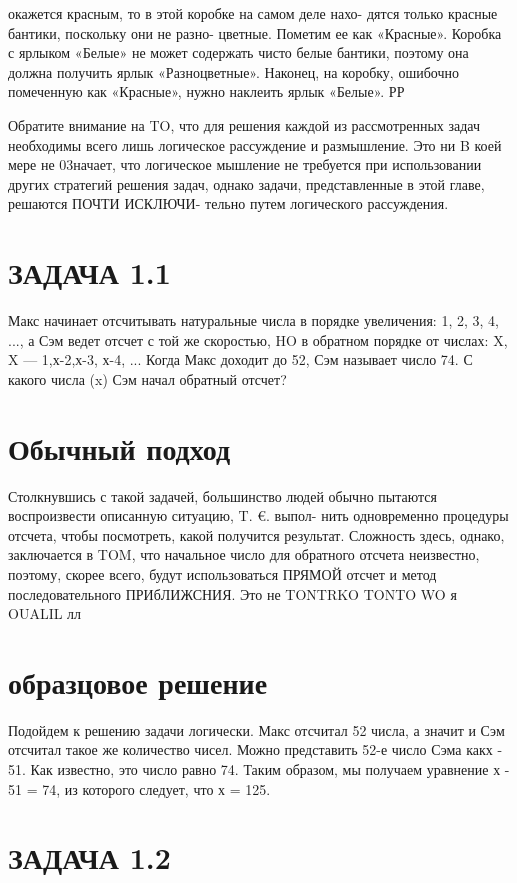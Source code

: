 окажется красным, то в этой коробке на самом деле нахо- дятся только красные бантики, поскольку они не разно- цветные. Пометим ее как «Красные». Коробка с ярлыком «Белые» не может содержать чисто белые бантики, поэтому она должна получить ярлык «Разноцветные». Наконец, на коробку, ошибочно помеченную как «Красные», нужно наклеить ярлык «Белые». РР

Обратите внимание на TO, что для решения каждой из рассмотренных задач необходимы всего лишь логическое рассуждение и размышление. Это ни B коей мере не 03начает, что логическое мышление не требуется при использовании других стратегий решения задач, однако задачи, представленные в этой главе, решаются ПОЧТИ ИСКЛЮЧИ- тельно путем логического рассуждения.

\section{ЗАДАЧА 1.1}

Макс начинает отсчитывать натуральные числа в порядке увеличения: 1, 2, 3, 4, ..., а Сэм ведет отсчет с той же скоростью, HO в обратном порядке от числах: X, X — 1,х-2,х-3, х-4, ... Когда Макс доходит до 52, Сэм называет число 74. С какого числа (x) Сэм начал обратный отсчет?

\section{Обычный подход}

Столкнувшись с такой задачей, большинство людей обычно пытаются воспроизвести описанную ситуацию, T. €. выпол- нить одновременно процедуры отсчета, чтобы посмотреть, какой получится результат. Сложность здесь, однако, заключается в TOM, что начальное число для обратного отсчета неизвестно, поэтому, скорее всего, будут использоваться ПРЯМОЙ отсчет и метод последовательного ПРИбЛИЖСНИЯ. Это не TONTRKO TONTO WO я OUALIL лл

\section{образцовое решение}

Подойдем к решению задачи логически. Макс отсчитал 52 числа, а значит и Сэм отсчитал такое же количество чисел. Можно представить 52-е число Сэма какх - 51. Как известно, это число равно 74. Таким образом, мы получаем уравнение х - 51 = 74, из которого следует, что х = 125.

\section{ЗАДАЧА 1.2}

